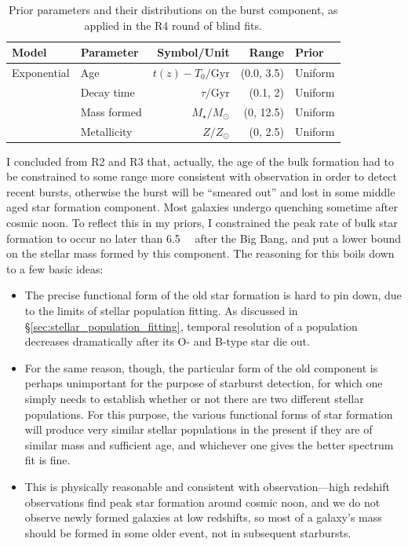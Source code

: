\documentclass[a4paper,12pt]{article}
\begin{document}
\begin{table}[h]
  \centering
  \begin{tabular}{l l r r l}
    Model       & Parameter   & Symbol/Unit             & Range      & Prior   \\
    \hline \hline
    Exponential & Age         & $t(z)-T_0/\mathrm{Gyr}$ & (0.0, 3.5) & Uniform \\ %
                & Decay time  & $\tau/\mathrm{Gyr}$     & (0.1, 2)   & Uniform \\
                & Mass formed & $M_\star/M_\odot$       & (0, 12.5)  & Uniform \\
                & Metallicity & $Z/Z_\odot$             & (0, 2.5)   & Uniform \\
    \hline
  \end{tabular}
  \caption{Prior parameters and their distributions on the burst component, as applied in the R4 round of blind fits.}
  \label{tab:r4_burst_priors}
\end{table}

I concluded from R2 and R3 that, actually, the age of the bulk formation had to
be constrained to some range more consistent with observation in order to
detect recent bursts, otherwise the burst will be ``smeared out'' and lost in
some middle aged star formation component. Most galaxies undergo quenching
sometime after cosmic noon.\cite{Tomczak_2014, Feldmann_2016} To reflect this
in my priors, I constrained the peak rate of bulk star formation to occur no
later than \SI{6.5}{\giga\year} after the Big Bang, and put a lower bound on
the stellar mass formed by this component. The reasoning for this boils down to
a few basic ideas:

\begin{itemize}
  \item The precise functional form of the old star formation is hard to pin
  down, due to the limits of stellar population fitting. As discussed in
  \S\ref{sec:stellar_population_fitting}, temporal resolution of a population
  decreases dramatically after its O- and B-type star die out.
  \item For the same reason, though, the particular form of the old component
  is perhaps unimportant for the purpose of starburst detection, for which one
  simply needs to establish whether or not there are two different stellar
  populations. For this purpose, the various functional forms of star formation
  will produce very similar stellar populations in the present if they are of
  similar mass and sufficient age, and whichever one gives the better spectrum
  fit is fine.
  \item This is physically reasonable and consistent with observation---high
  redshift observations find peak star formation around cosmic noon, and we do
  not observe newly formed galaxies at low redshifts, so most of a galaxy's
  mass should be formed in some older event, not in subsequent starbursts.
\end{itemize}
\end{document}
